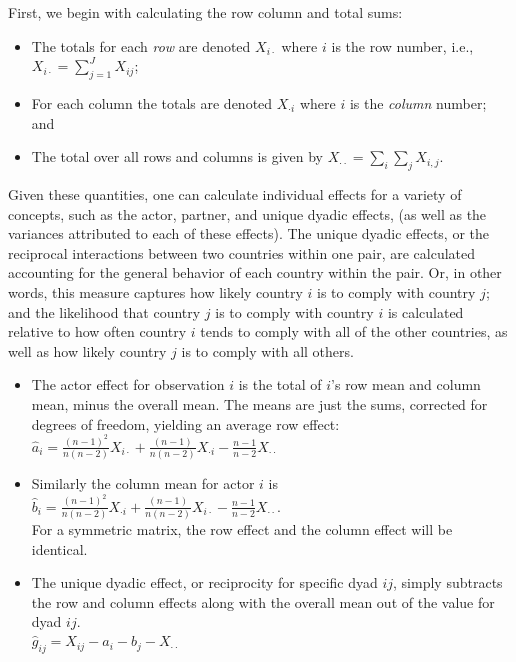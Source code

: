 \doublespacing
First, we begin with calculating the row column and total sums:

\begin{itemize}
	\item The totals for each \emph{ row} are denoted $X_{i \cdot}$ where $i$ is the row number, i.e.,
	~\\
	$X_{i \cdot} = \sum_{j=1}^{J} X_{ij}$;
	\item For each column the totals are denoted
	 $X_{\cdot i}$ where $i$ is the \emph{column} number; and 
	 \item The total over all rows and columns is given by $X_{\cdot \cdot} = \sum_i \sum_j X_{i,j}$.
 \end{itemize}
 
Given these quantities, one can calculate individual effects for a variety of concepts, such as the actor, partner, and unique dyadic effects, (as well as the variances attributed to each of these effects). The unique dyadic effects, or the reciprocal interactions between two countries within one pair, are calculated accounting for the general behavior of each country within the pair. Or, in other words, this measure captures how likely country $i$ is to comply with country $j$; and the likelihood that country $j$ is to comply with country $i$ is calculated relative to how often country $i$ tends to comply with all of the other countries, as well as how likely country $j$ is to comply with all others. 

 \begin{itemize}
	 \item The actor effect for observation $i$ is the total of $i$'s row mean and column mean, minus the overall mean.  The means are just the sums, corrected for degrees of freedom, yielding an average row effect:\\
	 $\hat{a}_i = \frac{(n-1)^2}{n(n-2)} X_{i \cdot} + \frac{(n-1)}{n(n-2)} X_{\cdot i} -  \frac{n-1}{n-2} X_{\cdot \cdot} $
	\item Similarly the column mean for actor $i$ is \\
	 $\hat{b}_i = \frac{(n-1)^2}{n(n-2)} X_{\cdot i} + \frac{(n-1)}{n(n-2)} X_{i \cdot } -  \frac{n-1}{n-2} X_{\cdot \cdot} $.\\ For a symmetric matrix, the row effect and the column effect will be identical.
	\item The unique dyadic effect, or reciprocity for specific dyad $ij$, simply subtracts the row and column effects along with the overall mean out of the value for dyad $ij$. \\
	$\hat{g}_{ij} = X_{ij} - \hat{a}_i - \hat{b}_j - X_{\cdot \cdot}$
 \end{itemize}

